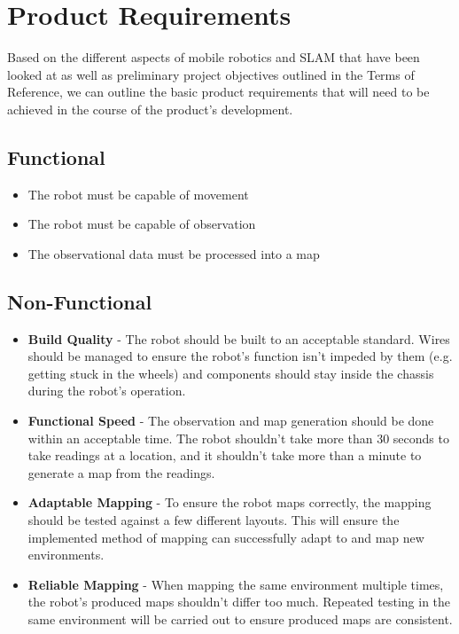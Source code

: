 		\chapter{Product Requirements}
		Based on the different aspects of mobile robotics and SLAM that have been looked at as well as preliminary project objectives outlined in the Terms of Reference, we can outline the basic product requirements that will need to be achieved in the course of the product's development.
		
			\section{Functional}
			\begin{itemize}
				\item The robot must be capable of movement
				\item The robot must be capable of observation
				\item The observational data must be processed into a map
			\end{itemize}
			
			
			\section{Non-Functional}
			\begin{itemize}
				\item \textbf{Build Quality} - The robot should be built to an acceptable standard. Wires should be managed to ensure the robot's function isn't impeded by them (e.g. getting stuck in the wheels) and components should stay inside the chassis during the robot's operation.
				\item \textbf{Functional Speed} - The observation and map generation should be done within an acceptable time. The robot shouldn't take more than 30 seconds to take readings at a location, and it shouldn't take more than a minute to generate a map from the readings.
				\item \textbf{Adaptable Mapping} - To ensure the robot maps correctly, the mapping should be tested against a few different layouts. This will ensure the implemented method of mapping can successfully adapt to and map new environments.
				\item \textbf{Reliable Mapping} - When mapping the same environment multiple times, the robot's produced maps shouldn't differ too much. Repeated testing in the same environment will be carried out to ensure produced maps are consistent.
			\end{itemize}
		
